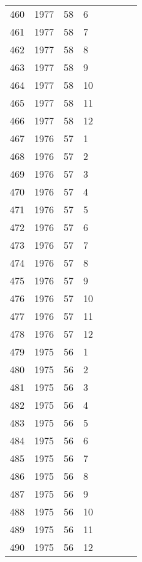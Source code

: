 \begin{longtable}{ |l|l|l|l|l|l|l|l| }
460 & 1977 & 58 &     6 &         &  &  & \\
461 & 1977 & 58 &     7 &         &  &  & \\
462 & 1977 & 58 &     8 &         &  &  & \\
463 & 1977 & 58 &     9 &         &  &  & \\
464 & 1977 & 58 &    10 &         &  &  & \\
465 & 1977 & 58 &    11 &         &  &  & \\
466 & 1977 & 58 &    12 &         &  &  & \\
467 & 1976 & 57 &     1 &         &  &  & \\
468 & 1976 & 57 &     2 &         &  &  & \\
469 & 1976 & 57 &     3 &         &  &  & \\
470 & 1976 & 57 &     4 &         &  &  & \\
471 & 1976 & 57 &     5 &         &  &  & \\
472 & 1976 & 57 &     6 &         &  &  & \\
473 & 1976 & 57 &     7 &         &  &  & \\
474 & 1976 & 57 &     8 &         &  &  & \\
475 & 1976 & 57 &     9 &         &  &  & \\
476 & 1976 & 57 &    10 &         &  &  & \\
477 & 1976 & 57 &    11 &         &  &  & \\
478 & 1976 & 57 &    12 &         &  &  & \\
479 & 1975 & 56 &     1 &         &  &  & \\
480 & 1975 & 56 &     2 &         &  &  & \\
481 & 1975 & 56 &     3 &         &  &  & \\
482 & 1975 & 56 &     4 &         &  &  & \\
483 & 1975 & 56 &     5 &         &  &  & \\
484 & 1975 & 56 &     6 &         &  &  & \\
485 & 1975 & 56 &     7 &         &  &  & \\
486 & 1975 & 56 &     8 &         &  &  & \\
487 & 1975 & 56 &     9 &         &  &  & \\
488 & 1975 & 56 &    10 &         &  &  & \\
489 & 1975 & 56 &    11 &         &  &  & \\
490 & 1975 & 56 &    12 &         &  &  & \\

\end{longtable}
